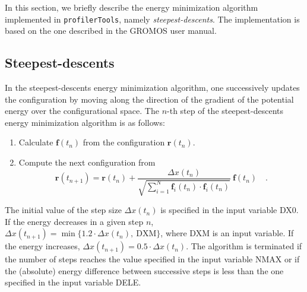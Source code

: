 \documentclass[10pt,a4paper,openany]{memoir}
\numberwithin{equation}{section}
\newcommand{\fsub}[1]{\mathbf{f}_{#1}}
\newcommand{\profilertools}[0]{\texttt{profilerTools}}
\begin{document}
In this section, we briefly describe the energy minimization algorithm implemented in \profilertools{}, namely
\textit{steepest-descents}.
The implementation is based on the one described in the GROMOS user manual\cite{GROMOS-doc}.

\subsection{Steepest-descents}
\label{sec:steep}

In the steepest-descents energy minimization algorithm, one successively updates the configuration by moving along the direction of the gradient of the potential energy over the configurational space.
The $n$-th step of the steepest-descents energy minimization algorithm is as follows: 
\begin{enumerate}
\item Calculate $\mathbf{f}(t_n)$ from the configuration $\mathbf{r}(t_n)$.
\item Compute the next configuration from
  \begin{equation}
    \label{eq:em-steep}
  \mathbf{r}(t_{n+1}) = \mathbf{r}(t_n) + \frac{\Delta x(t_n)}{\sqrt{\sum_{i=1}^N \fsub{i}(t_n)\cdot\fsub{i}(t_n)}}\ \mathbf{f}(t_n) \quad .
  \end{equation}
\end{enumerate}

The initial value of the step size $\Delta x(t_n)$ is specified in the input variable DX0.
If the energy decreases in a given step $n$, $\Delta x(t_{n+1}) = \min{\{1.2\cdot\Delta x(t_{n}),\ \text{DXM}\}}$, where DXM is an input variable.
If the energy increases, $\Delta x(t_{n+1}) = 0.5\cdot\Delta x(t_{n})$.
The algorithm is terminated if the number of steps reaches the value specified in the input variable NMAX or if the (absolute) energy difference between successive steps is less than the one specified in the input variable DELE.

\end{document}
